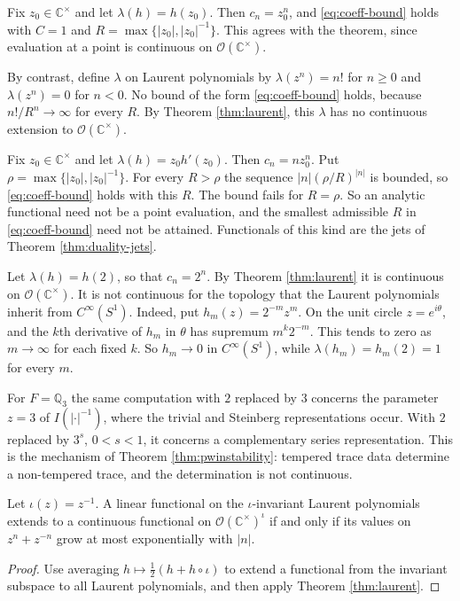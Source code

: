 \begin{example*}
Fix $z_0\in\mathbb C^\times$ and let $\lambda(h)=h(z_0)$. Then $c_n=z_0^n$, and \eqref{eq:coeff-bound} holds with $C=1$ and $R=\max\{|z_0|,|z_0|^{-1}\}$. This agrees with the theorem, since evaluation at a point is continuous on $\mathcal O(\mathbb C^\times)$.

By contrast, define $\lambda$ on Laurent polynomials by $\lambda(z^n)=n!$ for $n\ge0$ and $\lambda(z^n)=0$ for $n<0$. No bound of the form \eqref{eq:coeff-bound} holds, because $n!/R^n\to\infty$ for every $R$. By Theorem \ref{thm:laurent}, this $\lambda$ has no continuous extension to $\mathcal O(\mathbb C^\times)$.
\end{example*}

\begin{example}\label{ex:jet}
Fix $z_0\in\mathbb C^\times$ and let $\lambda(h)=z_0h'(z_0)$. Then $c_n=nz_0^n$. Put $\rho=\max\{|z_0|,|z_0|^{-1}\}$. For every $R>\rho$ the sequence $|n|(\rho/R)^{|n|}$ is bounded, so \eqref{eq:coeff-bound} holds with this $R$. The bound fails for $R=\rho$. So an analytic functional need not be a point evaluation, and the smallest admissible $R$ in \eqref{eq:coeff-bound} need not be attained. Functionals of this kind are the jets of Theorem \ref{thm:duality-jets}.
\end{example}

\begin{example}\label{ex:nontempered}
Let $\lambda(h)=h(2)$, so that $c_n=2^n$. By Theorem \ref{thm:laurent} it is continuous on $\mathcal O(\mathbb C^\times)$. It is not continuous for the topology that the Laurent polynomials inherit from $C^\infty(S^1)$. Indeed, put $h_m(z)=2^{-m}z^m$. On the unit circle $z=e^{i\theta}$, and the $k$th derivative of $h_m$ in $\theta$ has supremum $m^k2^{-m}$. This tends to zero as $m\to\infty$ for each fixed $k$. So $h_m\to0$ in $C^\infty(S^1)$, while $\lambda(h_m)=h_m(2)=1$ for every $m$.

For $F=\mathbb Q_3$ the same computation with $2$ replaced by $3$ concerns the parameter $z=3$ of $I(|\cdot|^{-1})$, where the trivial and Steinberg representations occur. With $2$ replaced by $3^{s}$, $0<s<1$, it concerns a complementary series representation. This is the mechanism of Theorem \ref{thm:pwinstability}: tempered trace data determine a non-tempered trace, and the determination is not continuous.
\end{example}

\begin{corollary}\label{cor:laurent-weyl}
Let $\iota(z)=z^{-1}$. A linear functional on the $\iota$-invariant Laurent polynomials extends to a continuous functional on $\mathcal O(\mathbb C^\times)^\iota$ if and only if its values on $z^n+z^{-n}$ grow at most exponentially with $|n|$.
\end{corollary}
\begin{proof}
Use averaging $h\mapsto\tfrac12(h+h\circ\iota)$ to extend a functional from the invariant subspace to all Laurent polynomials, and then apply Theorem \ref{thm:laurent}.
\end{proof}

